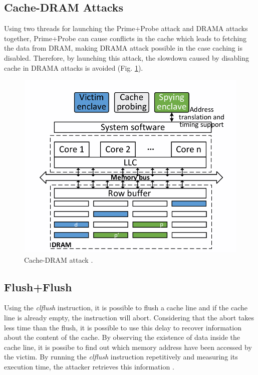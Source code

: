 \subsection{Cache-DRAM Attacks}
Using two threads for launching the Prime+Probe attack \cite{primeprobe1, primeprobe2} and DRAMA attacks \cite{drama} together, Prime+Probe can cause conflicts in the cache which leads to fetching the data from DRAM, making DRAMA attack possible in the case caching is disabled. Therefore, by launching this attack, the slowdown caused by disabling cache in DRAMA attacks is avoided \cite{leakycauldron} (Fig. \ref{fig:cachedram}).

\begin{figure}
	\includegraphics[scale=0.3]{images/cachedram}
	\caption{Cache-DRAM attack \cite{kayaalp2016high}.}
	\label{fig:cachedram}
\end{figure}

\subsection{Flush+Flush}
Using the \emph{clflush} instruction, it is possible to flush a cache line and if the cache line is already empty, the instruction will abort. Considering that the abort takes less time than the flush, it is possible to use this delay to recover information about the content of the cache. By observing the existence of data inside the cache line, it is possibe to find out which memory address have been accessed by the victim. By running the \emph{clflush} instruction repetitively and measuring its execution time, the attacker retrieves this information \cite{flushflush}.

